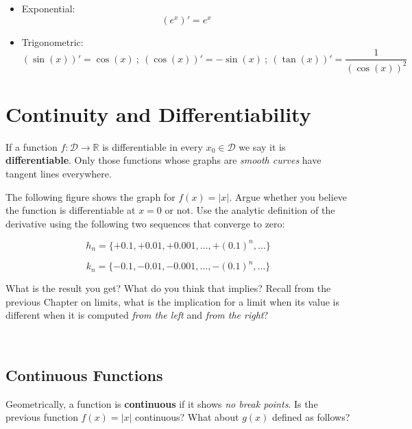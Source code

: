 \documentclass[11pt]{article}
\theoremstyle{definition}
\theoremstyle{plain}
\begin{document}
\begin{itemize}
\item
  Exponential: \[\left(e^x\right)' = e^x\]
\item
  Trigonometric: \[
  \left(\sin(x)\right)' = \cos(x) \ ; \ \left(\cos(x)\right)' = -\sin(x) \ ; \ \left(\tan(x)\right)' = \frac{1}{\left(\cos(x)\right)^2}
  \]
\end{itemize}

\section{Continuity and
Differentiability}\label{continuity-and-differentiability}

If a function \(f : \mathcal{D}\rightarrow\mathbb{R}\) is differentiable
in every \(x_0\in\mathcal{D}\) we say it is \textbf{differentiable}.
Only those functions whose graphs are \emph{smooth curves} have tangent
lines everywhere.

The following figure shows the graph for \(f(x) = \lvert x \rvert\).
Argue whether you believe the function is differentiable at \(x = 0\) or
not. Use the analytic definition of the derivative using the following
two sequences that converge to zero:

\[
h_n = \{+0.1, +0.01,+0.001,\ldots,+(0.1)^n,\ldots\}
\]

\[
k_n = \{-0.1, -0.01,-0.001,\ldots,-(0.1)^n,\ldots\}
\]

What is the result you get? What do you think that implies? Recall from
the previous Chapter on limits, what is the implication for a limit when
its value is different when it is computed \emph{from the left} and
\emph{from the right}?

    \begin{center}
    \end{center}
    { \hspace*{\fill} \\}
    
    \subsection{Continuous Functions}\label{continuous-functions}

Geometrically, a function is \textbf{continuous} if it shows \emph{no
break points}. Is the previous function \(f(x) = \lvert x \rvert\)
continuous? What about \(g(x)\) defined as follows?
\end{document}
